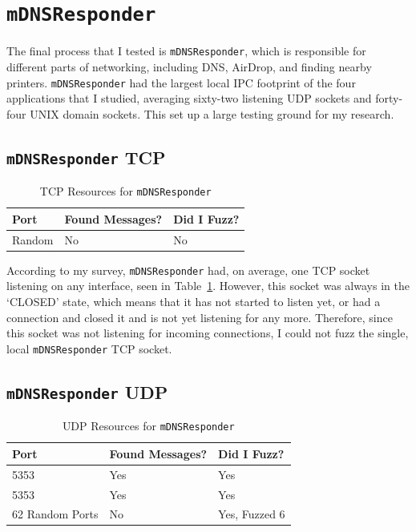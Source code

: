 \section{\texttt{mDNSResponder}}
\label{sec:mdns}
The final process that I tested is \texttt{mDNSResponder}, which is responsible for different parts of networking, including DNS, AirDrop, and finding nearby printers.  \texttt{mDNSResponder} had the largest local IPC footprint of the four applications that I studied, averaging sixty-two listening UDP sockets and forty-four UNIX domain sockets.  This set up a large testing ground for my research.

\subsection{\texttt{mDNSResponder} TCP}
\label{sec:mdnsTcp}

\begin{table}
\centering
\begin{normalsize}
\begin{tabular}{ l | l | l }
\textbf{Port} & \textbf{Found Messages?} & \textbf{Did I Fuzz?} \\ \hline
Random & No & No \\ \hline
\end{tabular}
\caption{TCP Resources for \texttt{mDNSResponder}}
\label{tab:mdnsTcpTab}
\end{normalsize}
\end{table} 

According to my survey, \texttt{mDNSResponder} had, on average, one TCP socket listening on any interface, seen in Table~\ref{tab:mdnsTcpTab}.  However, this socket was always in the `CLOSED' state, which means that it has not started to listen yet, or had a connection and closed it and is not yet listening for any more.  Therefore, since this socket was not listening for incoming connections, I could not fuzz the single, local \texttt{mDNSResponder} TCP socket.

\subsection{\texttt{mDNSResponder} UDP}
\label{sec:mdnsUdp}

\begin{table}
\centering
\begin{normalsize}
\begin{tabular}{ l | l | l }
\textbf{Port} & \textbf{Found Messages?} & \textbf{Did I Fuzz?} \\ \hline
5353 & Yes & Yes \\ \hline
5353 & Yes & Yes \\ \hline
62 Random Ports & No & Yes, Fuzzed 6 \\ \hline
\end{tabular}
\caption{UDP Resources for \texttt{mDNSResponder}}
\label{tab:mdnsUdpTab}
\end{normalsize}
\end{table} 

